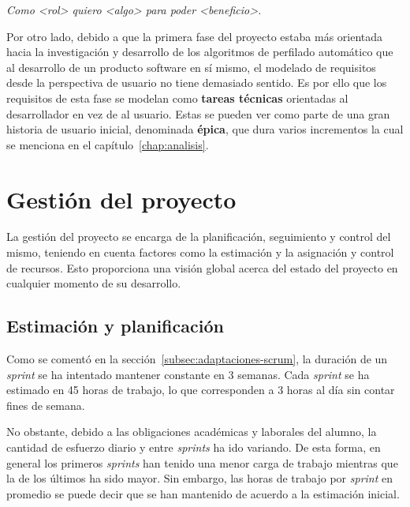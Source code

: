 \begin{center}
     \textit{Como <rol> quiero <algo> para poder <beneficio>.}
\end{center}

Por otro lado, debido a que la primera fase del proyecto estaba más orientada hacia la investigación y desarrollo de los algoritmos de perfilado automático que al desarrollo de un producto software en sí mismo, el modelado de requisitos desde la perspectiva de usuario no tiene demasiado sentido. Es por ello que los requisitos de esta fase se modelan como \textbf{tareas técnicas} orientadas al desarrollador en vez de al usuario. Estas se pueden ver como parte de una gran historia de usuario inicial, denominada \textbf{épica}, que dura varios incrementos la cual se menciona en el capítulo~\ref{chap:analisis}.%

\section{Gestión del proyecto}
La gestión del proyecto se encarga de la planificación, seguimiento y control del mismo, teniendo en cuenta factores como la estimación y la asignación y control de recursos. Esto proporciona una visión global acerca del estado del proyecto en cualquier momento de su desarrollo.
\subsection{Estimación y planificación}
Como se comentó en la sección~\ref{subsec:adaptaciones-scrum}, la duración de un \textit{sprint} se ha intentado mantener constante en 3 semanas. Cada \textit{sprint} se ha estimado en 45 horas de trabajo, lo que corresponden a 3 horas al día sin contar fines de semana.

No obstante, debido a las obligaciones académicas y laborales del alumno, la cantidad de esfuerzo diario y entre \textit{sprints} ha ido variando. De esta forma, en general los primeros \textit{sprints} han tenido una menor carga de trabajo mientras que la de los últimos ha sido mayor. Sin embargo, las horas de trabajo por \textit{sprint} en promedio se puede decir que se han mantenido de acuerdo a la estimación inicial.

